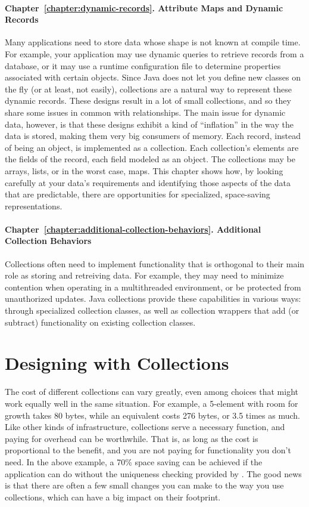 \paragraph{Chapter~\ref{chapter:dynamic-records}. Attribute Maps and Dynamic
Records} Many applications need to store data whose shape is not
known at compile time. For example, your application may use dynamic
queries to retrieve records from a database, or it may use
a runtime configuration file to determine properties associated with
certain objects. Since Java does not let you define new classes on the fly (or at
least, not easily), collections are a natural way to
represent these dynamic records. These designs result in a lot of small collections, and so they share some
issues in common with relationships. The main issue for dynamic data, however, 
is that these designs exhibit a kind of ``inflation'' in the
way the data is stored, making them very big consumers of memory. Each record,
instead of being an object, is implemented as a collection. Each collection's
elements are the fields of the record, each field modeled as an object.
The collections may be arrays, lists, or in the worst case, maps. This chapter shows how, by looking
carefully at your data's requirements and identifying those aspects of the data
that are predictable, there are opportunities for specialized,
space-saving representations.

\paragraph{Chapter~\ref{chapter:additional-collection-behaviors}. Additional
Collection Behaviors} Collections often need to implement functionality that is
orthogonal to their main role as storing and retreiving data.  For example, they
may need to minimize contention when operating in a multithreaded environment,
or be protected from unauthorized updates.  Java collections provide these
capabilities in various ways: through specialized collection classes, as well as
collection wrappers that add (or subtract) functionality on existing collection
classes.  

\section{Designing with Collections}

The cost of different collections can vary greatly, even among choices that
might work equally well in the same situation. For example, a 5-element 
with room for growth takes 80 bytes, while an equivalent  costs 276 bytes, or 3.5 times as much. 
Like other kinds of infrastructure, collections serve a necessary
function, and paying for overhead can be worthwhile.  That is, as long as
the cost is proportional to the benefit, and you are not paying
for functionality you don't need. In the above example, a 70\% space saving
can be achieved if the application can do without the uniqueness checking
provided by .  The good news is that there are often a few small
changes you can make to the way you use collections, which can have a big
impact on their footprint.

